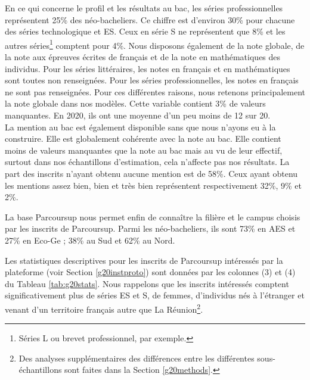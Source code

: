\documentclass[
]{book}
\begin{document}
En ce qui concerne le profil et les résultats au bac, les séries professionnelles représentent 25\% des néo-bacheliers. Ce chiffre est d'environ 30\% pour chacune des séries technologique et ES. Ceux en série S ne représentent que 8\% et les autres séries\footnote{Séries L ou brevet professionnel, par exemple.} comptent pour 4\%.
Nous disposons également de la note globale, de la note aux épreuves écrites de français et de la note en mathématiques des individus. Pour les séries littéraires, les notes en français et en mathématiques sont toutes non renseignées. Pour les séries professionnelles, les notes en français ne sont pas renseignées.
Pour ces différentes raisons, nous retenons principalement la note globale dans nos modèles. Cette variable contient 3\% de valeurs manquantes. En 2020, ils ont une moyenne d'un peu moins de 12 sur 20.\\
La mention au bac est également disponible sans que nous n'ayons eu à la construire. Elle est globalement cohérente avec la note au bac. Elle contient moins de valeurs manquantes que la note au bac mais au vu de leur effectif, surtout dans nos échantillons d'estimation, cela n'affecte pas nos résultats. La part des inscrits n'ayant obtenu aucune mention est de 58\%. Ceux ayant obtenu les mentions assez bien, bien et très bien représentent respectivement 32\%, 9\% et 2\%.

La base Parcoursup nous permet enfin de connaître la filière et le campus choisis par les inscrits de Parcoursup. Parmi les néo-bacheliers, ils sont 73\% en AES et 27\% en Eco-Ge ; 38\% au Sud et 62\% au Nord.

Les statistiques descriptives pour les inscrits de Parcoursup intéressés par la plateforme (voir Section \ref{g20instproto}) sont données par les colonnes (3) et (4) du Tableau \ref{tab:g20stats}. Nous rappelons que les inscrits intéressés comptent significativement plus de séries ES et S, de femmes, d'individus nés à l'étranger et venant d'un territoire français autre que La Réunion\footnote{Des analyses supplémentaires des différences entre les différentes sous-échantillons sont faites dans la Section \ref{g20methods}.}.
\end{document}
